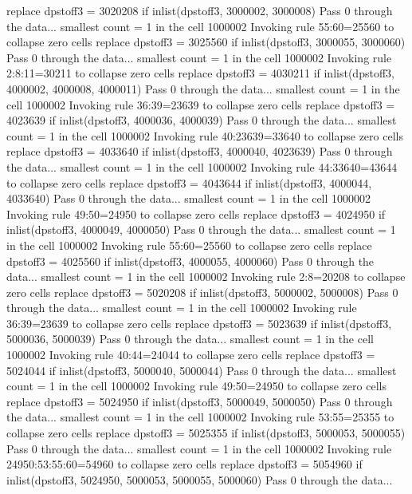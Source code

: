   replace dpstoff3 = 3020208 if inlist(dpstoff3, 3000002, 3000008)
Pass 0 through the data...
  smallest count = 1 in the cell      1000002
  Invoking rule 55:60=25560 to collapse zero cells
  replace dpstoff3 = 3025560 if inlist(dpstoff3, 3000055, 3000060)
Pass 0 through the data...
  smallest count = 1 in the cell      1000002
  Invoking rule 2:8:11=30211 to collapse zero cells
  replace dpstoff3 = 4030211 if inlist(dpstoff3, 4000002, 4000008, 4000011)
Pass 0 through the data...
  smallest count = 1 in the cell      1000002
  Invoking rule 36:39=23639 to collapse zero cells
  replace dpstoff3 = 4023639 if inlist(dpstoff3, 4000036, 4000039)
Pass 0 through the data...
  smallest count = 1 in the cell      1000002
  Invoking rule 40:23639=33640 to collapse zero cells
  replace dpstoff3 = 4033640 if inlist(dpstoff3, 4000040, 4023639)
Pass 0 through the data...
  smallest count = 1 in the cell      1000002
  Invoking rule 44:33640=43644 to collapse zero cells
  replace dpstoff3 = 4043644 if inlist(dpstoff3, 4000044, 4033640)
Pass 0 through the data...
  smallest count = 1 in the cell      1000002
  Invoking rule 49:50=24950 to collapse zero cells
  replace dpstoff3 = 4024950 if inlist(dpstoff3, 4000049, 4000050)
Pass 0 through the data...
  smallest count = 1 in the cell      1000002
  Invoking rule 55:60=25560 to collapse zero cells
  replace dpstoff3 = 4025560 if inlist(dpstoff3, 4000055, 4000060)
Pass 0 through the data...
  smallest count = 1 in the cell      1000002
  Invoking rule 2:8=20208 to collapse zero cells
  replace dpstoff3 = 5020208 if inlist(dpstoff3, 5000002, 5000008)
Pass 0 through the data...
  smallest count = 1 in the cell      1000002
  Invoking rule 36:39=23639 to collapse zero cells
  replace dpstoff3 = 5023639 if inlist(dpstoff3, 5000036, 5000039)
Pass 0 through the data...
  smallest count = 1 in the cell      1000002
  Invoking rule 40:44=24044 to collapse zero cells
  replace dpstoff3 = 5024044 if inlist(dpstoff3, 5000040, 5000044)
Pass 0 through the data...
  smallest count = 1 in the cell      1000002
  Invoking rule 49:50=24950 to collapse zero cells
  replace dpstoff3 = 5024950 if inlist(dpstoff3, 5000049, 5000050)
Pass 0 through the data...
  smallest count = 1 in the cell      1000002
  Invoking rule 53:55=25355 to collapse zero cells
  replace dpstoff3 = 5025355 if inlist(dpstoff3, 5000053, 5000055)
Pass 0 through the data...
  smallest count = 1 in the cell      1000002
  Invoking rule 24950:53:55:60=54960 to collapse zero cells
  replace dpstoff3 = 5054960 if inlist(dpstoff3, 5024950, 5000053, 5000055, 5000060)
Pass 0 through the data...
